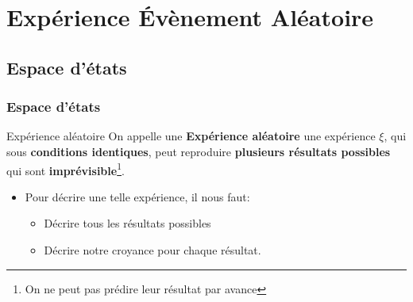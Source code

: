 \documentclass{beamer}
\begin{document}
\section{Expérience Évènement Aléatoire}
\subsection{Espace d'états}
\begin{frame}[<+->]
    \frametitle{Espace d'états}
    
    \begin{block}{Expérience aléatoire}
        \scriptsize
        On appelle une \textbf{\alert{Expérience aléatoire}} une expérience
        $\xi$, qui sous \textbf{conditions identiques}, peut reproduire
        \alert{\textbf{plusieurs résultats possibles}} qui sont
        \textbf{\alert{imprévisible}}\footnote{On ne peut pas prédire leur
            résultat par avance}.
    \end{block}
    \vspace{.5cm}
    \begin{itemize}
        \item Pour  décrire une telle expérience, il nous faut:
            \begin{itemize}
                \small
                \item \alert{Décrire tous les résultats possibles}\\[.2cm]
                \item  Décrire notre croyance pour chaque résultat.
            \end{itemize}
    \end{itemize}
\end{frame}
\end{document}
